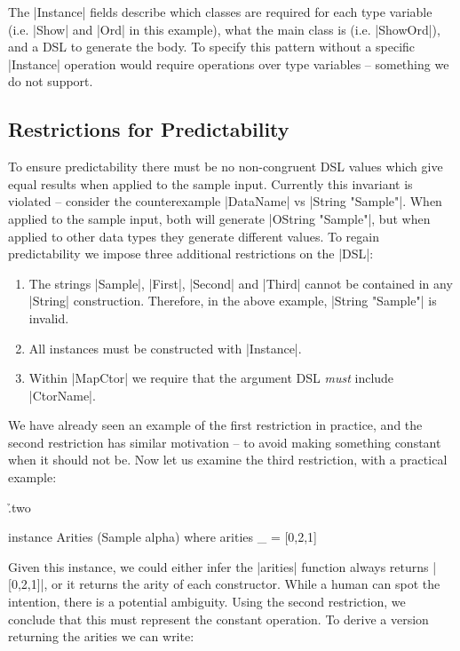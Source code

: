 \documentclass[preprint,draft]{sigplanconf}
\begin{document}
The |Instance| fields describe which classes are required for each type variable (i.e. |Show| and |Ord| in this example), what the main class is (i.e. |ShowOrd|), and a DSL to generate the body. To specify this pattern without a specific |Instance| operation would require operations over type variables -- something we do not support.

\subsection{Restrictions for Predictability}
\label{sec:predictability}

To ensure predictability there must be no non-congruent DSL values which give equal results when applied to the sample input. Currently this invariant is violated -- consider the counterexample |DataName| vs |String "Sample"|. When applied to the sample input, both will generate |OString "Sample"|, but when applied to other data types they generate different values. To regain predictability we impose three additional restrictions on the |DSL|:

\begin{enumerate}
\item The strings |Sample|, |First|, |Second| and |Third| cannot be contained in any |String| construction. Therefore, in the above example, |String "Sample"| is invalid.
\item All instances must be constructed with |Instance|.
\item Within |MapCtor| we require that the argument DSL \textit{must} include |CtorName|.
\end{enumerate}

We have already seen an example of the first restriction in practice, and the second restriction has similar motivation -- to avoid making something constant when it should not be. Now let us examine the third restriction, with a practical example:

\h{.two}\begin{code}
instance Arities (Sample alpha) where
    arities _ = [0,2,1]
\end{code}

Given this instance, we could either infer the |arities| function always returns |[0,2,1]|, or it returns the arity of each constructor. While a human can spot the intention, there is a potential ambiguity. Using the second restriction, we conclude that this must represent the constant operation. To derive a version returning the arities we can write:
\end{document}
